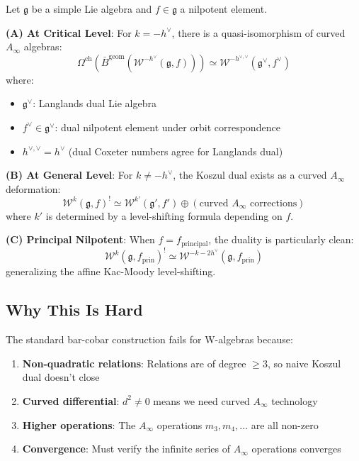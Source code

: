 \begin{theorem}\label{thm:w-koszul-precise}
Let $\mathfrak{g}$ be a simple Lie algebra and $f \in \mathfrak{g}$ a nilpotent element. 

\textbf{(A) At Critical Level}: For $k = -h^\vee$, there is a quasi-isomorphism of curved $A_\infty$ algebras:
\begin{equation}
\Omega^{\mathrm{ch}}(\bar{B}^{\mathrm{geom}}(\mathcal{W}^{-h^\vee}(\mathfrak{g}, f))) \simeq \mathcal{W}^{-h^{\vee,\vee}}(\mathfrak{g}^\vee, f^\vee)
\end{equation}
where:
\begin{itemize}
\item $\mathfrak{g}^\vee$: Langlands dual Lie algebra
\item $f^\vee \in \mathfrak{g}^\vee$: dual nilpotent element under orbit correspondence
\item $h^{\vee, \vee} = h^\vee$ (dual Coxeter numbers agree for Langlands dual)
\end{itemize}

\textbf{(B) At General Level}: For $k \neq -h^\vee$, the Koszul dual exists as a curved $A_\infty$ deformation:
\begin{equation}
\mathcal{W}^k(\mathfrak{g}, f)^! \simeq \mathcal{W}^{k'}(\mathfrak{g}', f') \oplus (\text{curved $A_\infty$ corrections})
\end{equation}
where $k'$ is determined by a level-shifting formula depending on $f$.

\textbf{(C) Principal Nilpotent}: When $f = f_{\text{principal}}$, the duality is particularly clean:
\begin{equation}
\mathcal{W}^k(\mathfrak{g}, f_{\text{prin}})^! \simeq \mathcal{W}^{-k-2h^\vee}(\mathfrak{g}, f_{\text{prin}})
\end{equation}
generalizing the affine Kac-Moody level-shifting.
\end{theorem}

\subsection{Why This Is Hard}

\begin{principle}
The standard bar-cobar construction fails for W-algebras because:
\begin{enumerate}
\item \textbf{Non-quadratic relations}: Relations are of degree $\geq 3$, so naive Koszul dual doesn't close
\item \textbf{Curved differential}: $d^2 \neq 0$ means we need curved $A_\infty$ technology
\item \textbf{Higher operations}: The $A_\infty$ operations $m_3, m_4, \ldots$ are all non-zero
\item \textbf{Convergence}: Must verify the infinite series of $A_\infty$ operations converges
\end{enumerate}
\end{principle}

